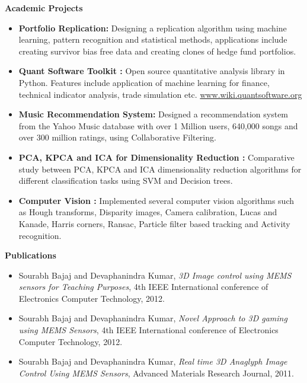 \documentclass[letterpaper,9pt]{article}
\newcommand{\resheading}[1]{{ \colorbox{mygrey}{\begin{minipage}{\textwidth}{\textbf{#1 \vphantom{p\^{E}}}}\end{minipage}}}}
\begin{document}
\resheading{Academic Projects}
	\vspace{-13pt}
	\begin{itemize}
		\item{\small \textbf{Portfolio Replication:} \small Designing a replication algorithm using machine learning, pattern recognition and statistical methods, applications include creating survivor bias free data and creating clones of hedge fund portfolios. }
			\vspace{-2pt}
		\item{\small \textbf{Quant Software Toolkit :} \small Open source quantitative analysis library in Python. Features include application of machine learning for finance, technical indicator analysis, trade simulation etc.   \url{www.wiki.quantsoftware.org}}
			\vspace{-2pt}
		\item{\small \textbf{Music Recommendation System:} \small Designed a recommendation system from the Yahoo Music database with over 1 Million users, 640,000 songs and over 300 million ratings, using Collaborative Filtering.}
			\vspace{-2pt}
		\item{\small \textbf{PCA, KPCA and ICA for Dimensionality Reduction :} \small Comparative study between PCA, KPCA and ICA dimensionality reduction algorithms for different classification tasks using SVM and Decision trees.}
			\vspace{-2pt}
		\item{\small \textbf{Computer Vision :} \small Implemented several computer vision algorithms such as Hough transforms, Disparity images, Camera calibration, Lucas and Kanade, Harris corners, Ransac, Particle filter based tracking and Activity recognition.}
	\end{itemize}
	

\resheading{Publications}
	\vspace{-13pt}
	\begin{itemize}
		\item 
			{\small Sourabh Bajaj and Devaphanindra Kumar, \textit{3D Image control using MEMS sensors for Teaching Purposes}, 4th IEEE International conference of Electronics Computer Technology, 2012.}
			\vspace{-2pt}
		\item 
			{\small Sourabh Bajaj and Devaphanindra Kumar, \textit{Novel Approach to 3D gaming using MEMS Sensors}, 4th IEEE International conference of Electronics Computer Technology, 2012.}
			\vspace{-2pt}
		\item 
			{\small Sourabh Bajaj and Devaphanindra Kumar, \textit{Real time 3D Anaglyph Image Control Using MEMS Sensors}, Advanced Materials Research Journal, 2011.}
	\end{itemize}  %
	
\end{document}
